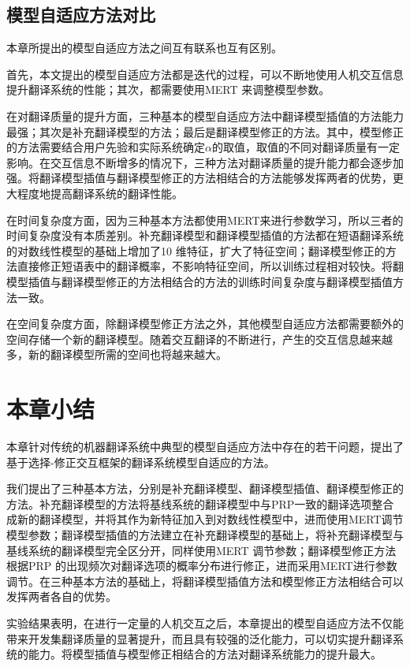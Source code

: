 \documentclass[master, winfont]{njuthesis}
\begin{document}
\subsection{模型自适应方法对比}
本章所提出的模型自适应方法之间互有联系也互有区别。

首先，本文提出的模型自适应方法都是迭代的过程，可以不断地使用人机交互信息提升翻译系统的性能；其次，都需要使用MERT 来调整模型参数。

在对翻译质量的提升方面，三种基本的模型自适应方法中翻译模型插值的方法能力最强；其次是补充翻译模型的方法；最后是翻译模型修正的方法。其中，模型修正的方法需要结合用户先验和实际系统确定$\alpha$的取值，取值的不同对翻译质量有一定影响。在交互信息不断增多的情况下，三种方法对翻译质量的提升能力都会逐步加强。将翻译模型插值与翻译模型修正的方法相结合的方法能够发挥两者的优势，更大程度地提高翻译系统的翻译性能。

在时间复杂度方面，因为三种基本方法都使用MERT来进行参数学习，所以三者的时间复杂度没有本质差别。补充翻译模型和翻译模型插值的方法都在短语翻译系统的对数线性模型的基础上增加了10 维特征，扩大了特征空间；翻译模型修正的方法直接修正短语表中的翻译概率，不影响特征空间，所以训练过程相对较快。将翻模型插值与翻译模型修正的方法相结合的方法的训练时间复杂度与翻译模型插值方法一致。

在空间复杂度方面，除翻译模型修正方法之外，其他模型自适应方法都需要额外的空间存储一个新的翻译模型。随着交互翻译的不断进行，产生的交互信息越来越多，新的翻译模型所需的空间也将越来越大。

\section{本章小结}
本章针对传统的机器翻译系统中典型的模型自适应方法中存在的若干问题，提出了基于选择-修正交互框架的翻译系统模型自适应的方法。

我们提出了三种基本方法，分别是补充翻译模型、翻译模型插值、翻译模型修正的方法。补充翻译模型的方法将基线系统的翻译模型中与PRP一致的翻译选项整合成新的翻译模型，并将其作为新特征加入到对数线性模型中，进而使用MERT调节模型参数；翻译模型插值的方法建立在补充翻译模型的基础上，将补充翻译模型与基线系统的翻译模型完全区分开，同样使用MERT 调节参数；翻译模型修正方法根据PRP 的出现频次对翻译选项的概率分布进行修正，进而采用MERT进行参数调节。在三种基本方法的基础上，将翻译模型插值方法和模型修正方法相结合可以发挥两者各自的优势。

实验结果表明，在进行一定量的人机交互之后，本章提出的模型自适应方法不仅能带来开发集翻译质量的显著提升，而且具有较强的泛化能力，可以切实提升翻译系统的能力。将模型插值与模型修正相结合的方法对翻译系统能力的提升最大。
\end{document}
